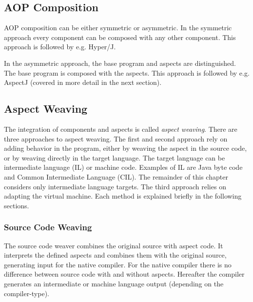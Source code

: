 \subsection{AOP Composition}
\label{sec:AOPComposition}

AOP composition can be either symmetric or asymmetric.
In the symmetric approach every component can be composed with any other component.
This approach is followed by e.g. Hyper/J.

In the asymmetric approach, the base program and aspects are distinguished.
The base program is composed with the aspects.
This approach is followed by e.g. AspectJ (covered in more detail in the next section).

\subsection{Aspect Weaving}
\label{sec:AspectWeaving}

%
%
The integration of components and aspects is called \emph{aspect weaving}.
There are three approaches to aspect weaving.
The first and second approach rely on adding behavior in the program, either by weaving the aspect in the source code, or by weaving directly in the target language.
The target language can be intermediate language (IL) or machine code.
Examples of IL are Java byte code and Common Intermediate Language (CIL).
The remainder of this chapter considers only intermediate language targets.
The third approach relies on adapting the virtual machine.
Each method is explained briefly in the following sections.

\subsubsection{Source Code Weaving}
\label{sec:source_code_weaving}

The source code weaver combines the original source with aspect code.
It interprets the defined aspects and combines them with the original source, generating input for the native compiler.
For the native compiler there is no difference between source code with and without aspects.
Hereafter the compiler generates an intermediate or machine language output (depending on the compiler-type).

